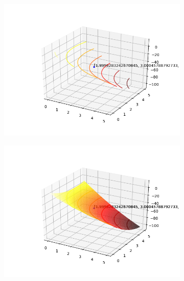 \documentclass[a4paper, 12pt]{article}
\begin{document}
\begin{figure}[H]
\centering
\begin{subfigure}{0.3\textwidth}
  \centering
  \includegraphics[width=\linewidth]{5/MPFE/A/BFGS/contorno.png}
\end{subfigure}%
\begin{subfigure}{0.3\textwidth}
  \centering
  \includegraphics[width=\linewidth]{5/MPFE/A/BFGS/superficie.png}
\end{subfigure}
\begin{subfigure}{0.3\textwidth}
  \centering

\end{subfigure}
\end{figure}
\end{document}
